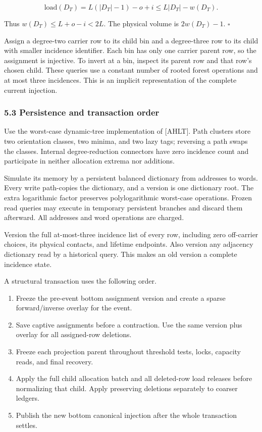 \[
\mathrm{load}(D_T)=L(|D_T|-1)-o+i
                         \leq L|D_T|-w(D_T).
\]

Thus \(w(D_T)\leq L+o-i<2L\). The physical volume is \(2w(D_T)-1\). \hfill\(\square\)

Assign a degree-two carrier row to its child bin and a degree-three row to its child with smaller incidence identifier. Each bin has only one carrier parent row, so the assignment is injective. To invert at a bin, inspect its parent row and that row's chosen child. These queries use a constant number of rooted forest operations and at most three incidences. This is an implicit representation of the complete current injection.

\hypertarget{af-46593eb93e-persistence-and-transaction-order}{%
\subsubsection{5.3 Persistence and transaction order}\label{af-46593eb93e-persistence-and-transaction-order}}

Use the worst-case dynamic-tree implementation of {[}AHLT{]}. Path clusters store two orientation classes, two minima, and two lazy tags; reversing a path swaps the classes. Internal degree-reduction connectors have zero incidence count and participate in neither allocation extrema nor additions.

Simulate its memory by a persistent balanced dictionary from addresses to words. Every write path-copies the dictionary, and a version is one dictionary root. The extra logarithmic factor preserves polylogarithmic worst-case operations. Frozen read queries may execute in temporary persistent branches and discard them afterward. All addresses and word operations are charged.

Version the full at-most-three incidence list of every row, including zero off-carrier choices, its physical contacts, and lifetime endpoints. Also version any adjacency dictionary read by a historical query. This makes an old version a complete incidence state.

A structural transaction uses the following order.

\begin{enumerate}
\def\labelenumi{\arabic{enumi}.}
\tightlist
\item
  Freeze the pre-event bottom assignment version and create a sparse forward/inverse overlay for the event.
\item
  Save captive assignments before a contraction. Use the same version plus overlay for all assigned-row deletions.
\item
  Freeze each projection parent throughout threshold tests, locks, capacity reads, and final recovery.
\item
  Apply the full child allocation batch and all deleted-row load releases before normalizing that child. Apply preserving deletions separately to coarser ledgers.
\item
  Publish the new bottom canonical injection after the whole transaction settles.
\end{enumerate}

